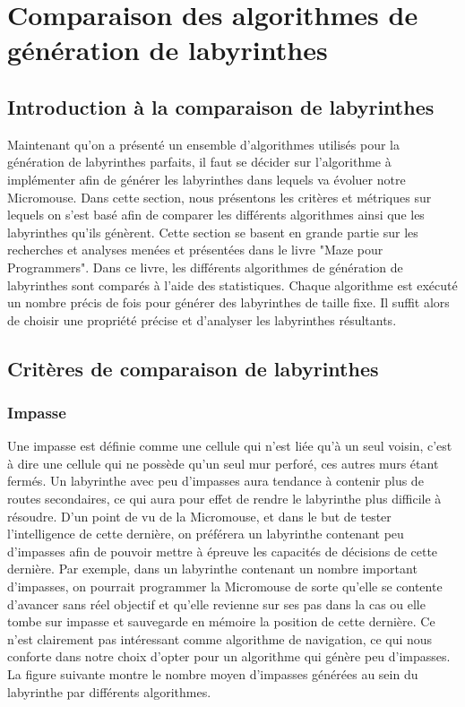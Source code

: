 \newpage
\section{Comparaison des algorithmes de génération de labyrinthes}
\subsection{Introduction à la comparaison de labyrinthes}
Maintenant qu'on a présenté un ensemble d'algorithmes utilisés pour la génération de labyrinthes parfaits, il faut se décider sur l'algorithme à implémenter afin de générer les labyrinthes dans lequels va évoluer notre Micromouse. Dans cette section, nous présentons les critères et métriques sur lequels on s'est basé afin de comparer les différents algorithmes ainsi que les labyrinthes qu'ils génèrent. Cette section se basent en grande partie sur les recherches et analyses menées et présentées dans le livre "Maze pour Programmers"\cite{maze_for_programmers}.
\newline
Dans ce livre, les différents algorithmes de génération de labyrinthes sont comparés à l'aide des statistiques. Chaque algorithme est exécuté un nombre précis de fois pour générer des labyrinthes de taille fixe. Il suffit alors de choisir une propriété précise et d'analyser les labyrinthes résultants.
\subsection{Critères de comparaison de labyrinthes}


\subsubsection{Impasse}
Une impasse est définie comme une cellule qui n'est liée qu'à un seul voisin, c'est à dire une cellule qui ne possède qu'un seul mur perforé, ces autres murs étant fermés.
Un labyrinthe avec peu d'impasses aura tendance à contenir plus de routes secondaires, ce qui aura pour effet de rendre le labyrinthe plus difficile à résoudre. 
\newline
D'un point de vu de la Micromouse, et dans le but de tester l'intelligence de cette dernière, on préférera un labyrinthe contenant peu d'impasses afin de pouvoir mettre à épreuve les capacités de décisions de cette dernière. Par exemple, dans un labyrinthe contenant un nombre important d'impasses, on pourrait programmer la Micromouse de sorte qu'elle se contente d'avancer sans réel objectif et qu'elle revienne sur ses pas dans la cas ou elle tombe sur impasse et sauvegarde en mémoire la position de cette dernière. 
Ce n'est clairement pas intéressant comme algorithme de navigation, ce qui nous conforte dans notre choix d'opter pour un algorithme qui génère peu d'impasses. La figure suivante montre le nombre moyen d'impasses générées au sein du labyrinthe par différents algorithmes.

